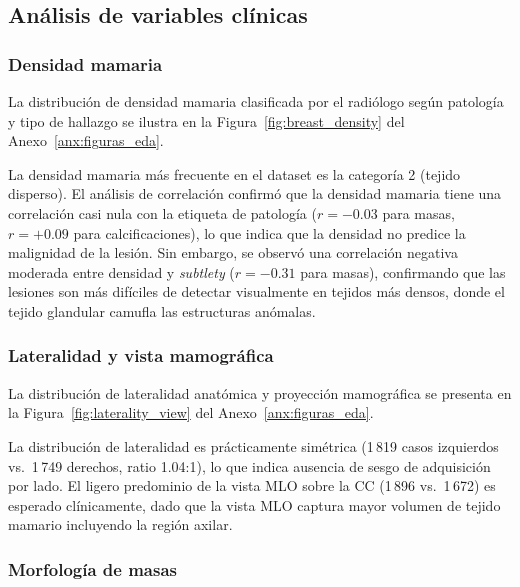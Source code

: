 
\subsection{Análisis de variables clínicas}

\subsubsection{Densidad mamaria}

La distribución de densidad mamaria clasificada por el radiólogo
según patología y tipo de hallazgo se ilustra en la
Figura~\ref{fig:breast_density} del Anexo~\ref{anx:figuras_eda}.

La densidad mamaria más frecuente en el dataset es
la categoría 2 (tejido disperso). El análisis de
correlación confirmó que la densidad mamaria tiene
una correlación casi nula con la etiqueta de
patología ($r = -0.03$ para masas, $r = +0.09$ para
calcificaciones), lo que indica que la densidad
no predice la malignidad de la lesión. Sin embargo,
se observó una correlación negativa moderada entre
densidad y \textit{subtlety} ($r = -0.31$ para masas),
confirmando que las lesiones son más difíciles de
detectar visualmente en tejidos más densos, donde
el tejido glandular camufla las estructuras anómalas.

\subsubsection{Lateralidad y vista mamográfica}

La distribución de lateralidad anatómica y proyección mamográfica
se presenta en la Figura~\ref{fig:laterality_view} del
Anexo~\ref{anx:figuras_eda}.

La distribución de lateralidad es prácticamente
simétrica (1\,819 casos izquierdos vs.\ 1\,749
derechos, ratio 1.04:1), lo que indica ausencia de
sesgo de adquisición por lado. El ligero predominio
de la vista MLO sobre la CC (1\,896 vs.\ 1\,672)
es esperado clínicamente, dado que la vista
MLO captura mayor volumen de tejido mamario
incluyendo la región axilar.

\subsubsection{Morfología de masas}

